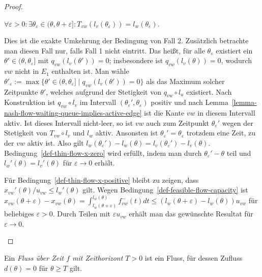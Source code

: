 \begin{proof}
\begin{description}[leftmargin=0cm, topsep=0cm, itemindent=\parindent]
		\item[3. Fall:] $\forall \varepsilon>0: \exists \theta_{\varepsilon}\in (\theta, \theta+\varepsilon]: T_{vw}(l_v(\theta_\varepsilon)) = l_w(\theta_\varepsilon)$.
		
		Dies ist die exakte Umkehrung der Bedingung von Fall 2.
		Zusätzlich betrachte man diesen Fall nur, falls Fall 1 nicht eintritt.
		Das heißt, für alle $\theta_\varepsilon$ existiert ein $\theta'\in(\theta, \theta_\varepsilon]$ mit $q_{vw}(l_v(\theta')) = 0$; insbesondere ist $q_{vw}(l_v(\theta))= 0$, wodurch $vw$ nicht in $E_1$ enthalten ist.
		Man wähle $\theta'_\varepsilon:=\max\{ \theta'\in (\theta, \theta_\varepsilon] \mid q_{vw}(l_v(\theta')) = 0 \}$ als das Maximum solcher Zeitpunkte $\theta'$, welches aufgrund der Stetigkeit von $q_{vw}\circ l_u$ existiert.
		Nach Konstruktion ist $q_{vw}\circ l_v$ im Intervall $(\theta_\varepsilon', \theta_\varepsilon)$ positiv und nach Lemma~\ref{lemma-nash-flow-waiting-queue-implies-active-edge} ist die Kante $vw$ in diesem Intervall aktiv.
		Ist dieses Intervall nicht-leer, so ist $vw$ auch zum Zeitpunkt $\theta_\varepsilon'$ wegen der Stetigkeit von $T_{vw}\circ l_v$ und $l_w$ aktiv.
		Ansonsten ist $\theta_\varepsilon'=\theta_\varepsilon$ trotzdem eine Zeit, zu der $vw$ aktiv ist.
		Also gilt $l_w(\theta_\varepsilon') - l_w(\theta) = l_v(\theta_\varepsilon') - l_v(\theta)$.
		Bedingung~\ref{def-thin-flow-x-zero} wird erfüllt, indem man durch $\theta_\varepsilon'-\theta$ teil und $l_w'(\theta) = l_v'(\theta)$ für $\varepsilon\rightarrow0$ erhält.
		
		Für Bedingung~\ref{def-thin-flow-x-positive} bleibt zu zeigen, dass $x_{vw}'(\theta) /u_{vw}\leq l_w'(\theta)$ gilt.
		Wegen Bedingung~\ref{def-feasible-flow-capacity} ist $x_{vw}(\theta + \varepsilon)-x_{vw}(\theta) = \int_{l_w(\theta+\varepsilon)}^{l_w(\theta)} f_{vw}^-(t) dt\leq (l_w(\theta + \varepsilon) - l_w(\theta)) u_{vw}$ für beliebiges $\varepsilon>0$.
		Durch Teilen mit $\varepsilon u_{vw}$ erhält man das gewünschte Resultat für $\varepsilon\rightarrow 0$.
	\end{description}
\vspace{-1.2 \baselineskip}\end{proof}

\begin{definition}
	Ein \emph{Fluss über Zeit $f$ mit Zeithorizont $T>0$} ist ein Fluss, für dessen Zufluss $d(\theta)= 0$ für $\theta\geq T$ gilt.
\end{definition}

